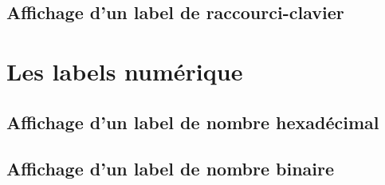 \subsection{Affichage d'un label de raccourci-clavier}


\section{Les labels numérique}

\subsection{Affichage d'un label de nombre hexadécimal}

\subsection{Affichage d'un label de nombre binaire}











